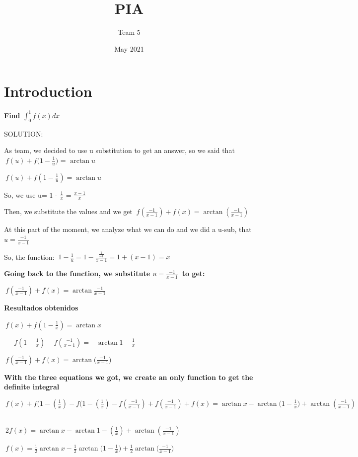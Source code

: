\documentclass{article}
\title{PIA}
\author{Team 5}
\date{May 2021}
\begin{document}
\maketitle

\section{Introduction}

\bigskip \textbf{ Find  $\int_{0}^1 f(x)dx $\ }

\bigskip SOLUTION:

\bigskip As team, we decided to use u substitution to get an answer, so we said that $\ f(u) + f({1-\frac{1}{u})}$ = $\arctan{u} $\ 

\bigskip $\ f(u)+f(1-\frac{1}{u}) =  \arctan{u} $\ 

\bigskip So, we use u= 1 - $\frac{1}{x}$ = $\frac{x-1}{x} $\

\bigskip Then, we substitute the values and we get $\ f(\frac{-1}{x-1})+f(x)=\arctan(\frac{-1}{x-1}) $\ 

\bigskip At this part of the moment, we analyze what we can do and we did a u-sub, that $u= \frac{-1}{x-1} $\

\bigskip So, the function: $\ 1-\frac{1}{u}=1-\frac{\frac{1}{-1}}{x-1} =1+(x-1)=x $\

\bigskip \textbf{Going back to the function, we substitute $u= \frac{-1}{x-1} $\ to get:}

\bigskip $\ f(\frac{-1}{x-1})+f(x)=\arctan\frac{-1}{x-1}$

\bigskip \textbf{Resultados obtenidos}

\bigskip $\ f(x)+f(1-\frac{1}{x})=\arctan{x} $\

\bigskip $\ -f(1-\frac{1}{x})-f(\frac{-1}{x-1})=-\arctan{1-\frac{1}{x}}$

\bigskip $\ f(\frac{-1}{x-1})+f(x)=\arctan({\frac{-1}{x-1})}$

\newpage

\bigskip \textbf {With the three equations we got, we create an only function to get the definite integral}

\bigskip $\ f(x)+f(1-(\frac{1}{x})-f(1-(\frac{1}{x})-f(\frac{-1}{x-1})+f(\frac{-1}{x-1})+f(x)=\arctan{x}-\arctan({1-\frac{1}{x})+\arctan{(\frac{-1}{x-1})}}$\

\bigskip $\ 2f(x)=\arctan{x}-\arctan{1-(\frac{1}{x})+\arctan{(\frac{-1}{x-1})}}$

\bigskip $\ f(x)=\frac{1}{2}\arctan{x}-\frac{1}{2}\arctan({1-\frac{1}{x})}+\frac{1}{2}\arctan({\frac{-1}{x-1})} $\
\end{document}

